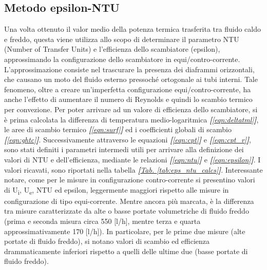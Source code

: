 \documentclass[a4paper,10pt]{article}                                                                                       %
\begin{document}
\subsection{Metodo epsilon-NTU}                                                                                             %
\label{subsec:epsntu_meth}                                                                                                  %
  Una volta ottenuto il valor medio della potenza termica trasferita tra fluido caldo e freddo, questa viene utilizza allo
  scopo di determinare il parametro NTU (Number of Transfer Units) e l'efficienza dello scambiatore (epsilon),
  approssimando la configurazione dello scambiatore in equi/contro-corrente. L'approssimazione consiste nel trascurare la
  presenza dei diaframmi orizzontali, che causano un moto del fluido esterno pressoché ortogonale ai tubi interni. Tale
  fenomeno, oltre a creare un'imperfetta configurazione equi/contro-corrente, ha anche l'effetto di aumentare il numero
  di Reynolds e quindi lo scambio termico per convezione. Per poter arrivare ad un valore di efficienza dello scambiatore,
  si è prima calcolata la differenza di temperatura medio-logaritmica \textit{\textbf{[}\ref{eqn:deltatml}\textbf{]}}, le
  aree di scambio termico \textit{\textbf{[}\ref{eqn:surf}\textbf{]}} ed i coefficienti globali di scambio
  \textit{\textbf{[}\ref{eqn:ghtc}\textbf{]}}. Successivamente attraverso le equazioni
  \textit{\textbf{[}\ref{eqn:cpt}\textbf{]}} e \textit{\textbf{[}\ref{eqn:cpt_r}\textbf{]}}, sono stati definiti i
  parametri intermedi utili per arrivare alla definizione dei valori di NTU e dell'efficienza, mediante le relazioni
  \textit{\textbf{[}\ref{eqn:ntu}\textbf{]}} e \textit{\textbf{[}\ref{eqn:epsilon}\textbf{]}}. I valori ricavati, sono
  riportati nella tabella \textit{\textbf{[}\hyperref[tab:eps_ntu_calcs]{Tab. }\ref{tab:eps_ntu_calcs}\textbf{]}}.
  Interessante notare, come per le misure in configurazione contro-corrente si presentino valori di U\textsubscript{i},
  U\textsubscript{e}, NTU ed epsilon, leggermente maggiori rispetto alle misure in configurazione di tipo equi-corrente.
  Mentre ancora più marcata, è la differenza tra misure caratterizzate da alte o basse portate volumetriche di fluido
  freddo (prima e seconda misura circa 550 [l/h], mentre terza e quarta approssimativamente 170 [l/h]). In particolare, per
  le prime due misure (alte portate di fluido freddo), si notano valori di scambio ed efficienza drammaticamente inferiori
  rispetto a quelli delle ultime due (basse portate di fluido freddo).
\end{document}
